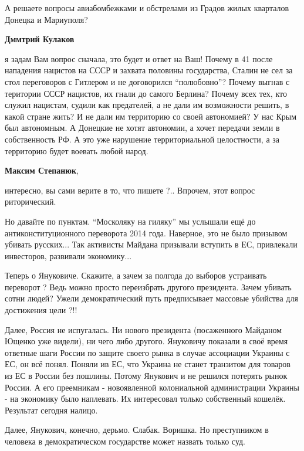 \begin{itemize}
\begin{itemize}
А решаете вопросы авиабомбежками и обстрелами из Градов жилых кварталов Донецка
и Мариуполя?


\textbf{Дммтрий Кулаков} 

я задам Вам вопрос сначала, это будет и ответ на Ваш! Почему в 41 после
нападения нацистов на СССР и захвата половины государства, Сталин не сел за
стол переговоров с Гитлером и не договорился \enquote{полюбовно}? Почему выгнав с
територии СССР нацистов, их гнали до самого Берлина? Почему всех тех, кто
служил нацистам, судили как предателей, а не дали им возможности решить, в
какой стране жить? И не дали им территорию со своей автономией? У нас Крым был
автономным. А Донецкие не хотят автономии, а хочет передачи земли в
собственность РФ. А это уже нарушение территориальной целостности, а за
территорию будет воевать любой народ.


\textbf{Максим Степанюк}, 

интересно, вы сами верите в то, что пишете ?.. Впрочем, этот вопрос
риторический.

Но давайте по пунктам. \enquote{Москоляку на гиляку} мы услышали ещё до
антиконституционного переворота 2014 года. Наверное, это не было призывом
убивать русских... Так активисты Майдана призывали вступить в ЕС, привлекали
инвесторов, развивали экономику...

Теперь о Януковиче. Скажите, а зачем за полгода до выборов устраивать переворот
? Ведь можно просто переизбрать другого президента. Зачем убивать сотни людей?
Ужели демократический путь предписывает массовые убийства для достижения цели
?!!

Далее, Россия не испугалась. Ни нового президента (посаженного Майданом Ющенко
уже видели), ни чего либо другого. Януковичу показали в своё время ответные
шаги России по защите своего рынка в случае ассоциации Украины с ЕС, он всё
понял. Поняли ив ЕС, что Украина не станет транзитом для товаров из ЕС в России
без пошлины. Потому Янукович и не решился потерять рынок России. А его
преемникам - новоявленной колониальной администрации Украины - на экономику
было наплевать. Их интересовал только собственный кошелёк. Результат сегодня
налицо.

Далее, Янукович, конечно, дерьмо. Слабак. Воришка. Но преступником в человека в
демократическом государстве может назвать только суд. 


\end{itemize}
\end{itemize}
